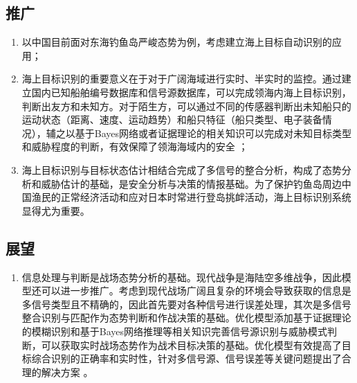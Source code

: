 \subsection{推广}
\begin{enumerate}
	\item 以中国目前面对东海钓鱼岛严峻态势为例，考虑建立海上目标自动识别的应用；
	\item 海上目标识别的重要意义在于对于广阔海域进行实时、半实时的监控。通过建立国内已知船舶编号数据库和信号源数据库，可以完成领海内海上目标识别，判断出友方和未知方。对于陌生方，可以通过不同的传感器判断出未知船只的运动状态（距离、速度、运动趋势）和船只特征（船只类型、电子装备情况），辅之以基于Bayes网络或者证据理论的相关知识可以完成对未知目标类型和威胁程度的判断，有效保障了领海海域内的安全\cite{Bayes} ；
	\item 海上目标识别与目标状态估计相结合完成了多信号的整合分析，构成了态势分析和威胁估计的基础，是安全分析与决策的情报基础。为了保护钓鱼岛周边中国渔民的正常经济活动和应对日本时常进行登岛挑衅活动，海上目标识别系统显得尤为重要。
\end{enumerate}
\subsection{展望}
\begin{enumerate}
	\item 信息处理与判断是战场态势分析的基础。现代战争是海陆空多维战争，因此模型还可以进一步推广。考虑到现代战场广阔且复杂的环境会导致获取的信息是多信号类型且不精确的，因此首先要对各种信号进行误差处理，其次是多信号整合识别与匹配作为态势判断和作战决策的基础。优化模型添加基于证据理论的模糊识别和基于Bayes网络推理等相关知识完善信号源识别与威胁模式判断，可以获取实时战场态势作为战术目标决策的基础。优化模型有效提高了目标综合识别的正确率和实时性，针对多信号源、信号误差等关键问题提出了合理的解决方案\cite{identify} 。
\end{enumerate}
